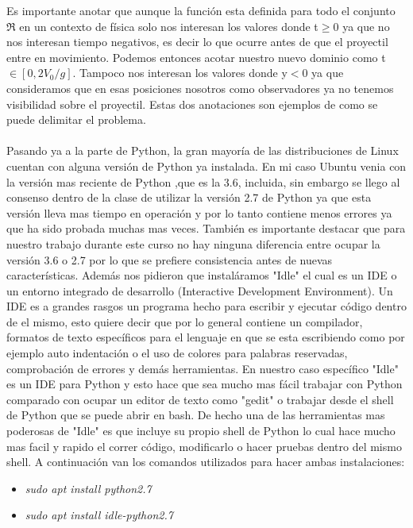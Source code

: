 \documentclass[letterpaper, 12pt, oneside]{article}
\begin{document}
	Es importante anotar que aunque la función esta definida para todo el conjunto $\Re$ en un contexto de física solo nos interesan los valores donde t$\geq$0 ya que no nos interesan tiempo negativos, es decir lo que ocurre antes de que el proyectil entre en movimiento. Podemos entonces acotar nuestro nuevo dominio como t$\in[0,2V_{0}/g]$. Tampoco nos interesan los valores donde y$<$0 ya que consideramos que en esas posiciones nosotros como observadores ya no tenemos visibilidad sobre el proyectil. Estas dos anotaciones son ejemplos de como se puede delimitar el problema.
	\\
	\\
	Pasando ya a la parte de Python, la gran mayoría de las distribuciones de Linux cuentan con alguna versión de Python ya instalada. En mi caso Ubuntu venia con la versión mas reciente de Python ,que es la 3.6, incluida, sin embargo se llego al consenso dentro de la clase de utilizar la versión 2.7 de Python ya que esta versión lleva mas tiempo en operación y por lo tanto contiene menos errores ya que ha sido probada muchas mas veces. También es importante destacar que para nuestro trabajo durante este curso no hay ninguna diferencia entre ocupar la versión 3.6 o 2.7 por lo que se prefiere consistencia antes de nuevas características. Además nos pidieron que instaláramos "Idle" el cual es un IDE o un entorno integrado de desarrollo (Interactive Development Environment). Un IDE es a grandes rasgos un programa hecho para escribir y ejecutar código dentro de el mismo, esto quiere decir que por lo general contiene un compilador, formatos de texto específicos para el lenguaje en que se esta escribiendo como por ejemplo auto indentación o el uso de colores para palabras reservadas, comprobación de errores y demás herramientas. En nuestro caso específico "Idle" es un IDE para Python y esto hace que sea mucho mas fácil trabajar con Python comparado con ocupar un editor de texto como "gedit" o trabajar desde el shell de Python que se puede abrir en bash. De hecho una de las herramientas mas poderosas de "Idle" es que incluye su propio shell de Python lo cual hace mucho mas facil y rapido el correr código, modificarlo o hacer pruebas dentro del mismo shell. A continuación van los comandos utilizados para hacer ambas instalaciones:
	\begin{itemize}
		\item \textit{sudo apt install python2.7}
		\item \textit{sudo apt install idle-python2.7}
	\end{itemize}
\end{document}
